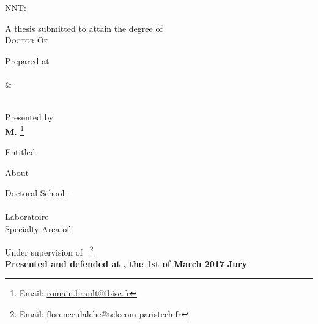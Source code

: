 \begin{titlepage}
\begin{addmargin}[-1cm]{-3cm}
\vspace{2cm}
NNT: \NNT

\vspace{-.5cm}

\begin{center}
\large

\hfill

\begingroup
{A thesis submitted to attain the degree of} \\
{\Huge \color{PSaclay}\textsc{Doctor Of} \\ \textsc{\myUni}}
\endgroup

\vspace{.5cm}
\begingroup
Prepared at \\
{\Huge \color{PSaclay}\textsc{\myUniUEVE}} \\
{\LARGE \&} \\
{\Huge \color{PSaclay}\textsc{\myUniTP}} \\
\endgroup

\vspace{.5cm}
\begingroup
Presented by \\
{\Large\textbf{M. \textsc{\myName}}}\footnote{Email: \href{mailto:romain.brault@ibisc.fr}{romain.brault@ibisc.fr}} %
\endgroup

\bigskip
\vfill

\begingroup
Entitled \\
\smallskip
{\Huge \color{PSaclay}\textsc{\myTitle}} %
\endgroup

\bigskip
\vfill

\begingroup
About \\
{\Large \textbf{\textsc{\mySubtitle}}} %
\endgroup

\bigskip
\vfill

\begingroup
Doctoral School -- \EDN \\
\myDoctoralSchool \\
Laboratoire \myFaculty \\
Specialty Area of \myDepartment
\medskip

\endgroup
\end{center}
\vspace{1cm}
\vfill

\noindent Under supervision of \mySupervisorDegree~\textsc{\mySupervisor}\footnote{Email: \href{mailto:florence.dalche@telecom-paristech.fr}{florence.dalche@telecom-paristech.fr}} \\
\smallskip
\noindent \textbf{Presented and defended at \myUniUEVE, the 1st of March 2017}
\smallskip
\noindent \textbf{Jury}

\end{addmargin}
\end{titlepage}
